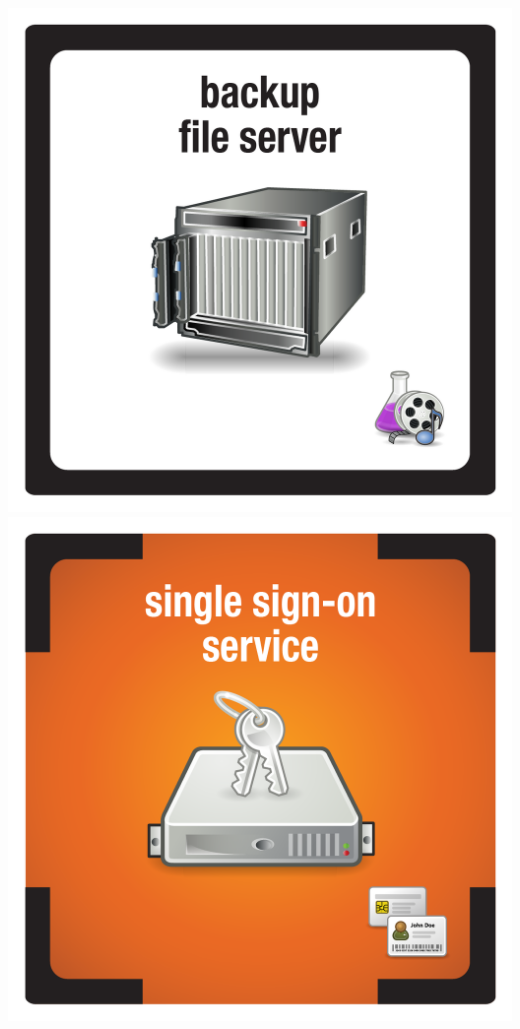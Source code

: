 \documentclass{letter}
\begin{document}
\includegraphics{tiles/node_backup_file_server}
\includegraphics{tiles/node_sso_service_compromised} \\
\end{document}
